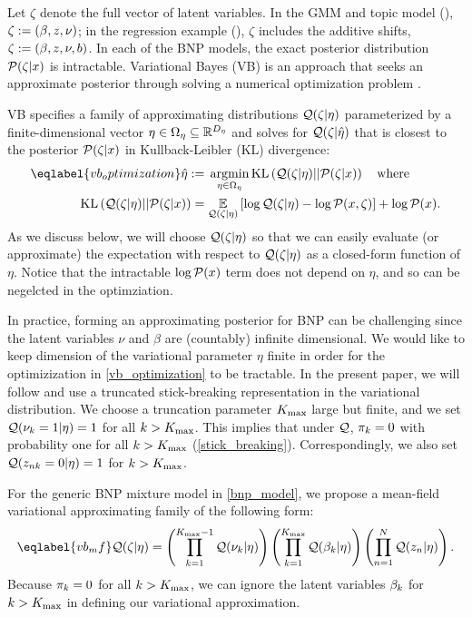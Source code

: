Let $\zeta$ denote the full vector of
latent variables.
In the GMM and topic model (),
$\zeta := (\beta, z, \nu)$;
in the regression example (),
$\zeta$ includes the additive shifts, $\zeta := (\beta, z, \nu, b)$.
In each of the BNP models,
the exact posterior distribution $\mathcal{P}(\zeta \vert x)$
is intractable.
Variational Bayes (VB) is an approach that seeks an approximate posterior
through solving a numerical optimization problem
\citep{jordan:1999:vi, wainwright:2008:graphical_models, blei:2017:vi_review}.

VB specifies a
family of approximating distributions $\mathcal{Q}(\zeta \vert \eta)$
parameterized by a finite-dimensional vector $\eta \in \Omega_{\eta} \subseteq
\mathbb{R}^{{D_{\eta}}}$
and solves for $\mathcal{Q}(\zeta\vert\hat\eta)$
that is closest to the posterior $\mathcal{P}(\zeta \vert x)$ in
Kullback-Leibler (KL) divergence:
%
\begin{align}\eqlabel{vb_optimization}
%
\etaopt :={}&
    \argmin_{\eta \in \etadom}
        \KL{\q(\zeta \vert \eta) || \p(\zeta \vert \x)} \mathwhere \\
\KL{\q(\zeta \vert \eta) || \p(\zeta \vert \x)}
={}&    \expect{\q(\zeta \vert \eta)}{
        \log \q(\zeta \vert \eta) - \logp(\x, \zeta)} + \logp(\x). \nonumber
%
\end{align}
%
As we discuss
below, we will choose $\mathcal{Q}(\zeta \vert \eta)$ so that we can easily evaluate (or approximate)
the expectation with respect to $\mathcal{Q}(\zeta \vert \eta)$
as a closed-form function of $\eta$.
Notice that the intractable $\log \mathcal{P}(x)$ term does not depend on $\eta$, and
so can be negelcted in the optimziation.

In practice, forming an approximating posterior for BNP
can be challenging since the latent variables $\nu$ and $\beta$ are
(countably) infinite dimensional.
We would like to keep dimension of the variational parameter $\eta$ finite
in order for the optimizization in \eqref{vb_optimization} to be tractable.
In the present paper, we will follow \citet{blei:2006:vi_for_dp} and
use a truncated stick-breaking representation in
the variational distribution.
We choose a truncation parameter ${K_{\mathrm{max}}}$ large but finite,
and we set $\mathcal{Q}(\nu_k = 1 | \eta) = 1$ for all $k > {K_{\mathrm{max}}}$.
This implies that under $\mathcal{Q}$, $\pi_k = 0$ with probability one
for all $k > {K_{\mathrm{max}}}$
(\eqref{stick_breaking}).
Correspondingly, we also set $\mathcal{Q}(z_{nk} = 0 | \eta) = 1$ for $k > {K_{\mathrm{max}}}$.

For the generic BNP mixture model in \eqref{bnp_model},
we propose a mean-field variational approximating family of the following form:
%
\begin{align}\eqlabel{vb_mf}
%
\q(\zeta \vert \eta) =
    \left( \prod_{\k=1}^{\kmax - 1} \q(\nuk \vert \eta) \right)
    \left( \prod_{\k=1}^{\kmax} \q(\beta_\k \vert \eta) \right)
    \left( \prod_{\n=1}^{\N} \q(\z_{\n} \vert \eta) \right).
%
\end{align}
Because $\pi_k = 0$ for all $k > {K_{\mathrm{max}}}$,
we can ignore the latent variables $\beta_k$ for $k > {K_{\mathrm{max}}}$ in
defining our variational approximation.

